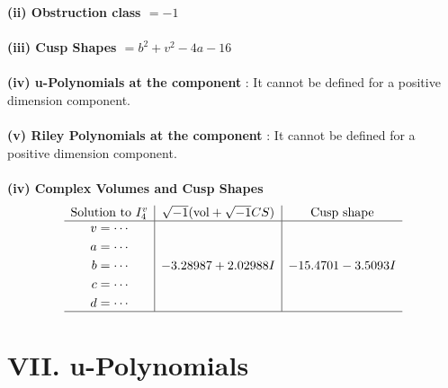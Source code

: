 \documentclass[1p]{elsarticle_modified}
\theoremstyle{definition}
\newcommand{\I}{\sqrt{-1}}
\begin{document}
\flushleft \textbf{(ii) Obstruction class $= -1$}\\~\\
\flushleft \textbf{(iii) Cusp Shapes $= b^2+v^2-4 a-16$}\\~\\
\flushleft \textbf{(iv) u-Polynomials at the component} : It cannot be defined for a positive dimension component.\\~\\
\flushleft \textbf{(v) Riley Polynomials at the component} : It cannot be defined for a positive dimension component.\\~\\
\newpage\flushleft \textbf{(iv) Complex Volumes and Cusp Shapes}
$$\begin{array}{c|c|c} 
\text{Solution to }I^v_{4}& \I (\text{vol} + \sqrt{-1}CS) & \text{Cusp shape}\\
 \hline 
\begin{aligned}
v &= \cdots \\
a &= \cdots \\
b &= \cdots \\
c &= \cdots \\
d &= \cdots\end{aligned}
 & -3.28987 + 2.02988 I & -15.4701 - 3.5093 I\\
 \hline 
 \end{array}
$$
\newpage\renewcommand{\arraystretch}{1}
\centering \section*{ VII. u-Polynomials}
\end{document}
